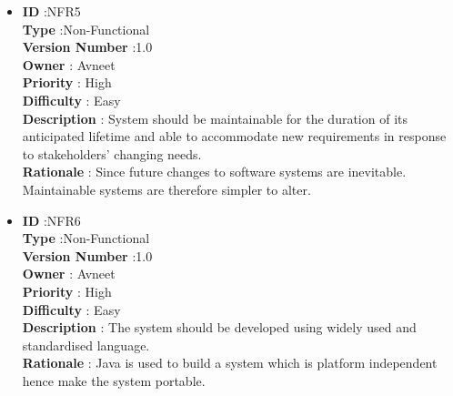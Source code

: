 \documentclass[a4paper,12pt]{report}
\begin{document}
\begin{itemize}
	\item
    \textbf{ID } \hspace{3cm} :NFR5  \\
	\textbf{Type } \hspace{2.4cm}  :Non-Functional\\
	\textbf{Version Number} \hspace{0.3cm} :1.0  \\
	\textbf{Owner } \hspace{1.98cm} : Avneet \\
	\textbf{Priority } \hspace{1.75cm} : High\\
	\textbf{Difficulty } \hspace{1.5cm} : Easy\\
	\textbf{Description }\hspace{1.2cm} : System should be maintainable for the duration of its anticipated lifetime and able to accommodate new requirements in response to stakeholders' changing needs. \\
	\textbf{Rationale }\hspace{1.6cm} : Since future changes to software systems are inevitable. Maintainable systems are therefore simpler to alter.\\

	\item
    \textbf{ID } \hspace{3cm} :NFR6  \\
	\textbf{Type } \hspace{2.4cm}  :Non-Functional\\
	\textbf{Version Number} \hspace{0.3cm} :1.0  \\
	\textbf{Owner } \hspace{1.98cm} : Avneet \\
	\textbf{Priority } \hspace{1.75cm} : High\\
	\textbf{Difficulty } \hspace{1.5cm} : Easy\\
	\textbf{Description }\hspace{1.2cm} : The system should be developed using widely used and standardised language. \\
	\textbf{Rationale }\hspace{1.6cm} : Java is used to build a system which is platform independent hence make the system portable.\\


\end{itemize}
\end{document}
